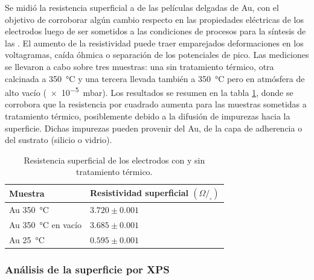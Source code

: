 {{			Se midió la resistencia superficial a de las películas delgadas de Au, con el objetivo de corroborar algún cambio respecto en las propiedades eléctricas de los electrodos luego de ser sometidos a las condiciones de procesos para la síntesis de las \pdm. El aumento de la resistividad puede traer emparejados deformaciones en los voltagramas, caída óhmica o separación de los potenciales de pico. Las mediciones se llevaron a cabo sobre tres muestras: una sin tratamiento térmico, otra calcinada a \SI{350}{\celsius} y una tercera llevada también a \SI{350}{\celsius} pero en atmósfera de alto vacío (\SI{e-5}{\milli\bar}). Los resultados se resumen en la tabla \ref{tabla:resistencia}, donde se corrobora que la resistencia por cuadrado aumenta para las muestras sometidas a tratamiento térmico, posiblemente debido a la difusión de impurezas hacia la superficie. Dichas impurezas pueden provenir del Au, de la capa de adherencia o del sustrato (silicio o vidrio).

				\begin{table}[ht!]
			  		  \caption[Resistencia superficial de los electrodos]{Resistencia superficial de los electrodos con y sin tratamiento térmico.} 
			  		  \begin{tabular}{>{\raggedright\arraybackslash}m{4.2cm}>{\raggedright\arraybackslash}m{7.075cm}} 
			  		  \toprule
					  Muestra & Resistividad superficial $(\Omega/_{\square})$  \\ \midrule
			      	  Au\index{oro} \SI{350}{\celsius} 		  	& $3.720 \pm 0.001$		 \\	  
			      	  Au\index{oro} \SI{350}{\celsius} en vacío	& $3.685 \pm 0.001$		 \\	  
			      	  Au\index{oro} \SI{25}{\celsius}    	  		& $0.595 \pm 0.001$		 \\ 
			      	  \bottomrule
			    	  \end{tabular}
			    	  \label{tabla:resistencia}
			   		  \end{table}	
	
		\subsubsection{Análisis de la superficie por XPS}

}}
